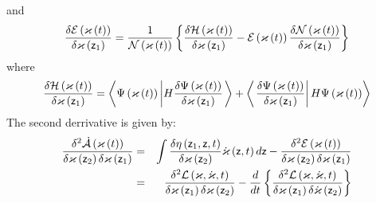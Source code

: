 and 
\begin{equation}
\frac{\delta {\cal E}\left( {\cal \varkappa }\left( t\right) \right) }{%
\delta \varkappa \left( {\sf z}_{1}\right) }=\frac{1}{{\cal N}\left( {\cal %
\varkappa }\left( t\right) \right) }\left\{ \frac{\delta {\cal H}\left(
\varkappa \left( t\right) \right) }{\delta \varkappa \left( {\sf z}%
_{1}\right) }-{\cal E}\left( {\cal \varkappa }\left( t\right) \right) \frac{%
\delta {\cal N}\left( \varkappa \left( t\right) \right) }{\delta \varkappa
\left( {\sf z}_{1}\right) }\right\} 
\end{equation}%
where 
\begin{equation}
\frac{\delta {\cal H}\left( \varkappa \left( t\right) \right) }{\delta
\varkappa \left( {\sf z}_{1}\right) }=\left\langle \Psi \left( {\cal %
\varkappa }\left( t\right) \right) \left| H\frac{\delta \Psi \left( {\cal %
\varkappa }\left( t\right) \right) }{\delta \varkappa \left( {\sf z}%
_{1}\right) }\right. \right\rangle +\left\langle \left. \frac{\delta \Psi
\left( {\cal \varkappa }\left( t\right) \right) }{\delta \varkappa \left( 
{\sf z}_{1}\right) }\right| H\Psi \left( {\cal \varkappa }\left( t\right)
\right) \right\rangle 
\end{equation}%
The second derrivative is given by: 
\begin{eqnarray}
\frac{\delta ^{2}{\cal \dot{A}}\left( \varkappa \left( t\right) \right) }{%
\delta \varkappa \left( {\sf z}_{2}\right) \delta \varkappa \left( {\sf z}%
_{1}\right) } &=&\int \frac{\delta \eta \left( {\sf z}_{1},{\sf z},t\right) 
}{\delta \varkappa \left( {\sf z}_{2}\right) }{\cal \dot{\varkappa}}\left( 
{\sf z},t\right) d{\sf z}-\frac{\delta ^{2}{\cal E}\left( {\cal \varkappa }%
\left( t\right) \right) }{\delta \varkappa \left( {\sf z}_{2}\right) \delta
\varkappa \left( {\sf z}_{1}\right) }  \label{ha} \\
&=&\frac{\delta ^{2}{\cal L}\left( {\cal \varkappa },{\cal \dot{\varkappa}}%
,t\right) }{\delta \varkappa \left( {\sf z}_{1}\right) \delta \varkappa
\left( {\sf z}_{2}\right) }-\frac{d}{dt}\left\{ \frac{\delta ^{2}{\cal L}%
\left( \varkappa ,\dot{\varkappa},t\right) }{\delta \varkappa \left( {\sf z}%
_{1}\right) \delta \dot{\varkappa}\left( {\sf z}_{2}\right) }\right\} 
\label{hb}
\end{eqnarray}

